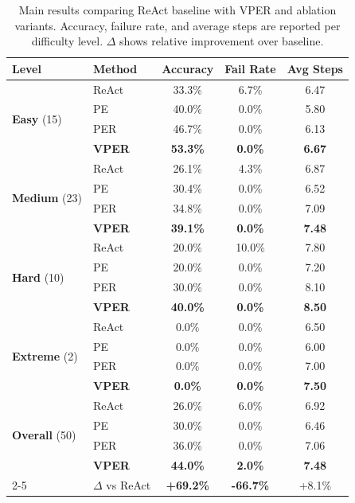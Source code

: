 \documentclass{article}
\begin{document}
\begin{table}[t]
\centering
\caption{Main results comparing ReAct baseline with VPER and ablation variants. Accuracy, failure rate, and average steps are reported per difficulty level. $\Delta$ shows relative improvement over baseline.}
\label{tab:main-results}
\begin{threeparttable}
\begin{tabular}{l l ccc}
\toprule
\textbf{Level} & \textbf{Method} & \textbf{Accuracy} & \textbf{Fail Rate} & \textbf{Avg Steps} \\
\midrule
\multirow{4}{*}{\textbf{Easy} (15)}
  & ReAct     & 33.3\% & 6.7\% & 6.47 \\
  & PE        & 40.0\% & 0.0\% & 5.80 \\
  & PER       & 46.7\% & 0.0\% & 6.13 \\
  & \textbf{VPER} & \textbf{53.3\%} & \textbf{0.0\%} & \textbf{6.67} \\
\midrule
\multirow{4}{*}{\textbf{Medium} (23)}
  & ReAct     & 26.1\% & 4.3\% & 6.87 \\
  & PE        & 30.4\% & 0.0\% & 6.52 \\
  & PER       & 34.8\% & 0.0\% & 7.09 \\
  & \textbf{VPER} & \textbf{39.1\%} & \textbf{0.0\%} & \textbf{7.48} \\
\midrule
\multirow{4}{*}{\textbf{Hard} (10)}
  & ReAct     & 20.0\% & 10.0\% & 7.80 \\
  & PE        & 20.0\% & 0.0\% & 7.20 \\
  & PER       & 30.0\% & 0.0\% & 8.10 \\
  & \textbf{VPER} & \textbf{40.0\%} & \textbf{0.0\%} & \textbf{8.50} \\
\midrule
\multirow{4}{*}{\textbf{Extreme} (2)}
  & ReAct     & 0.0\% & 0.0\% & 6.50 \\
  & PE        & 0.0\% & 0.0\% & 6.00 \\
  & PER       & 0.0\% & 0.0\% & 7.00 \\
  & \textbf{VPER} & \textbf{0.0\%} & \textbf{0.0\%} & \textbf{7.50} \\
\midrule
\multirow{4}{*}{\textbf{Overall} (50)}
  & ReAct     & 26.0\% & 6.0\% & 6.92 \\
  & PE        & 30.0\% & 0.0\% & 6.46 \\
  & PER       & 36.0\% & 0.0\% & 7.06 \\
  & \textbf{VPER} & \textbf{44.0\%} & \textbf{2.0\%} & \textbf{7.48} \\
\cmidrule{2-5}
  & $\Delta$ vs ReAct & \textbf{+69.2\%} & \textbf{-66.7\%} & +8.1\% \\
\bottomrule
\end{tabular}
\end{threeparttable}
\end{table}
\end{document}
